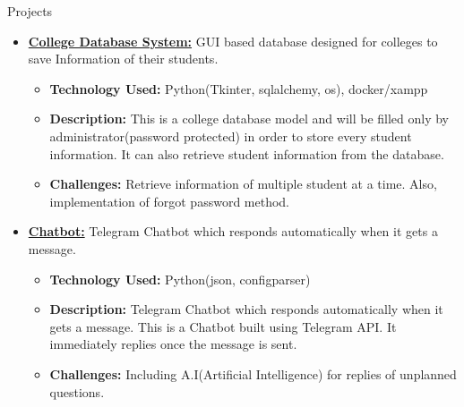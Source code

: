 \begin{rSection}{Projects}
    \begin{itemize}
        \item \textbf{\href{https://github.com/akashpapnai/Database_model_for_college}{College Database System:}} GUI based database designed for colleges to save Information of their students.
        \begin{itemize}
            \item \textbf{Technology Used:} Python(Tkinter, sqlalchemy, os), docker/xampp
            \item \textbf{Description:} This is a college database model and will be filled only by administrator(password protected) in order to store every student
            information. It can also retrieve student information from the database.
            \item \textbf{Challenges:} Retrieve information of multiple student at a time. Also, implementation of forgot password method.
        \end{itemize}
        \item \textbf{\href{https://github.com/akashpapnai/Chatbot}{Chatbot:}} Telegram Chatbot which responds automatically when it gets a message.
        \begin{itemize}
            \item \textbf{Technology Used:} Python(json, configparser)
            \item \textbf{Description:} Telegram Chatbot which responds automatically when it gets a message. This is a Chatbot built using Telegram API. It
            immediately replies once the message is sent.
            \item \textbf{Challenges:} Including A.I(Artificial Intelligence) for replies of unplanned questions.
        \end{itemize}
    \end{itemize}
\end{rSection}